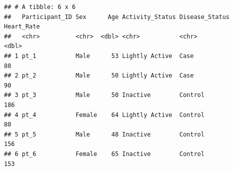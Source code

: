 \documentclass[
]{article}
\begin{document}
\begin{verbatim}
## # A tibble: 6 x 6
##   Participant_ID Sex      Age Activity_Status Disease_Status Heart_Rate
##   <chr>          <chr>  <dbl> <chr>           <chr>               <dbl>
## 1 pt_1           Male      53 Lightly Active  Case                   80
## 2 pt_2           Male      50 Lightly Active  Case                   90
## 3 pt_3           Male      50 Inactive        Control               186
## 4 pt_4           Female    64 Lightly Active  Control                80
## 5 pt_5           Male      48 Inactive        Control               156
## 6 pt_6           Female    65 Inactive        Control               153
\end{verbatim}
\end{document}

